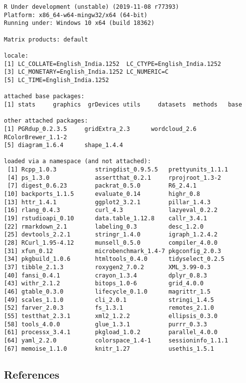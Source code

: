 \documentclass[
]{article}
\begin{document}
\begin{verbatim}
R Under development (unstable) (2019-11-08 r77393)
Platform: x86_64-w64-mingw32/x64 (64-bit)
Running under: Windows 10 x64 (build 18362)

Matrix products: default

locale:
[1] LC_COLLATE=English_India.1252  LC_CTYPE=English_India.1252   
[3] LC_MONETARY=English_India.1252 LC_NUMERIC=C                  
[5] LC_TIME=English_India.1252    

attached base packages:
[1] stats     graphics  grDevices utils     datasets  methods   base     

other attached packages:
[1] PGRdup_0.2.3.5     gridExtra_2.3      wordcloud_2.6      RColorBrewer_1.1-2
[5] diagram_1.6.4      shape_1.4.4       

loaded via a namespace (and not attached):
 [1] Rcpp_1.0.3           stringdist_0.9.5.5   prettyunits_1.1.1   
 [4] ps_1.3.0             assertthat_0.2.1     rprojroot_1.3-2     
 [7] digest_0.6.23        packrat_0.5.0        R6_2.4.1            
[10] backports_1.1.5      evaluate_0.14        highr_0.8           
[13] httr_1.4.1           ggplot2_3.2.1        pillar_1.4.3        
[16] rlang_0.4.3          curl_4.3             lazyeval_0.2.2      
[19] rstudioapi_0.10      data.table_1.12.8    callr_3.4.1         
[22] rmarkdown_2.1        labeling_0.3         desc_1.2.0          
[25] devtools_2.2.1       stringr_1.4.0        igraph_1.2.4.2      
[28] RCurl_1.95-4.12      munsell_0.5.0        compiler_4.0.0      
[31] xfun_0.12            microbenchmark_1.4-7 pkgconfig_2.0.3     
[34] pkgbuild_1.0.6       htmltools_0.4.0      tidyselect_0.2.5    
[37] tibble_2.1.3         roxygen2_7.0.2       XML_3.99-0.3        
[40] fansi_0.4.1          crayon_1.3.4         dplyr_0.8.3         
[43] withr_2.1.2          bitops_1.0-6         grid_4.0.0          
[46] gtable_0.3.0         lifecycle_0.1.0      magrittr_1.5        
[49] scales_1.1.0         cli_2.0.1            stringi_1.4.5       
[52] farver_2.0.3         fs_1.3.1             remotes_2.1.0       
[55] testthat_2.3.1       xml2_1.2.2           ellipsis_0.3.0      
[58] tools_4.0.0          glue_1.3.1           purrr_0.3.3         
[61] processx_3.4.1       pkgload_1.0.2        parallel_4.0.0      
[64] yaml_2.2.0           colorspace_1.4-1     sessioninfo_1.1.1   
[67] memoise_1.1.0        knitr_1.27           usethis_1.5.1       
\end{verbatim}

\hypertarget{references}{%
\subsection*{References}\label{references}}
\end{document}
